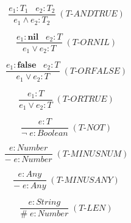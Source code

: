 \documentclass[12pt]{article}
\begin{document}
\[
\frac{e_{1}:T_{1} \;\;\; e_{2}:T_{2}}
     {e_{1} \land e_{2} : T_{2}} \; (\textit{T-ANDTRUE})
\]

\[
\frac{e_{1}:\textbf{nil} \;\;\; e_{2}:T}
     {e_{1} \lor e_{2} : T} \; (\textit{T-ORNIL})
\]

\[
\frac{e_{1}:\textbf{false} \;\;\; e_{2}:T}
     {e_{1} \lor e_{2} : T} \; (\textit{T-ORFALSE})
\]

\[
\frac{e_{1}:T}
     {e_{1} \lor e_{2} : T} \; (\textit{T-ORTRUE})
\]

\[
\frac{e : T}
     {\lnot \; e : Boolean} \; (\textit{T-NOT})
\]

\[
\frac{e : Number}
     {- \; e : Number} \; (\textit{T-MINUSNUM})
\]

\[
\frac{e : Any}
     {- \; e : Any} \; (\textit{T-MINUSANY})
\]

\[
\frac{e : String}
     {\# \; e : Number} \; (\textit{T-LEN})
\]
\end{document}

